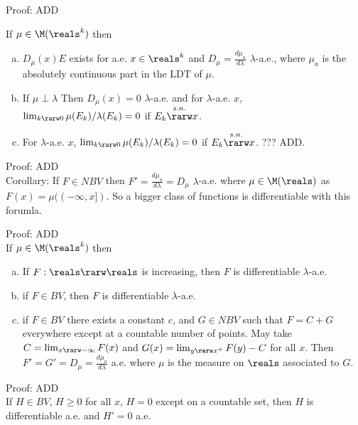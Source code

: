 \vspace{0.5in}

\noindent
Proof: ADD \\


\break




If $\mu \in \M(\reals^k)$ then
\begin{enumerate}[a)]
\item
$D_\mu(x)E$ exists for a.e. $x \in \reals^k$ and $D_\mu = \frac{d\mu_a}{d\lambda}$ $\lambda$-a.e., where $\mu_a$ is the absolutely continuous part in the LDT of $\mu$.
\item
If $\mu \perp \lambda$ Then $D_\mu(x) = 0$ $\lambda$-a.e. and for $\lambda$-a.e. $x$, $\lim_{k \rarw 0} \mu(E_k) / \lambda(E_k) = 0$ if $E_k \overset{s.n.}{\rarw} x$.
\item
For $\lambda$-a.e. $x$, $\lim_{k \rarw 0} \mu(E_k) / \lambda(E_k) = 0$ if $E_k \overset{s.n.}{\rarw} x$. ??? ADD.
\end{enumerate}



\noindent
Proof: ADD \\

Corollary: If $F \in NBV$ then $F' = \frac{d\mu_a}{d\lambda} = D_\mu$ $\lambda$-a.e. where $\mu \in \M(\reals)$ as $F(x) = \mu((-\infty,x])$. So a bigger class of functions is differentiable with this forumla.

\noindent
Proof: ADD \\



If $\mu \in \M(\reals^k)$ then
\begin{enumerate}[a)]
\item
If $F: \reals \rarw \reals$ is increasing, then $F$ is differentiable $\lambda$-a.e.
\item
if $F \in BV$, then $F$ is differentiable $\lambda$-a.e.
\item
if $F \in BV$  there exists a constant $c$, and $G \in NBV$ such that $F = C + G$ everywhere except at a countable number of points. May take $C = \lim_{x \rarw - \infty}  F(x)$ and $G(x) = \lim_{ y \rarw x^+} F(y) - C$ for all $x$. Then $F' = G' = D_\mu = \frac{d\mu_a}{d\lambda}$ a.e. where $\mu$ is the measure on $\reals$ associated to $G$.
\end{enumerate}


\noindent
Proof: ADD \\


If $H \in BV$, $H \ge 0$ for all $x$, $H = 0$ except on a countable set, then $H$ is differentiable a.e. and $H' = 0$ a.e.


